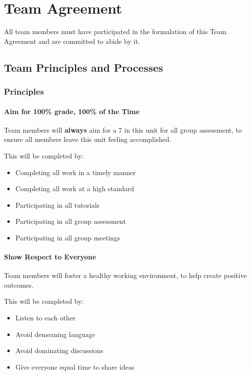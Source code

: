 \documentclass[12pt, a4paper, onecolumn]{article}
\begin{document}
\newpage
\section{Team Agreement}
All team members must have participated in the formulation of
this Team Agreement and are committed to abide by it.

\subsection{Team Principles and Processes}

\subsubsection{Principles}
\paragraph{Aim for 100\% grade, 100\% of the Time}
Team members will \textbf{always} aim for a 7 in this unit for all group
assessment, to ensure all members leave this unit feeling accomplished.

This will be completed by:
\begin{itemize}
  \setlength\itemsep{1px}
  \item Completing all work in a timely manner
  \item Completing all work at a high standard
  \item Participating in all tutorials
  \item Participating in all group assessment
  \item Participating in all group meetings
\end{itemize}

\paragraph{Show Respect to Everyone}
Team members will foster a healthy working environment, to help
create positive outcomes.

This will be completed by:
\begin{itemize}
  \setlength\itemsep{1px}
  \item Listen to each other
  \item Avoid demeaning language
  \item Avoid dominating discussions
  \item Give everyone equal time to share ideas
\end{itemize}
\end{document}
